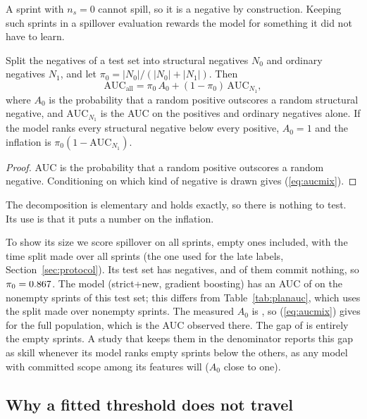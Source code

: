 A sprint with $n_s = 0$ cannot spill, so it is a negative by construction. Keeping such sprints in a spillover evaluation rewards the model for something it did not have to learn.

\begin{proposition}
\label{prop:auc}
Split the negatives of a test set into structural negatives $N_0$ and ordinary negatives $N_1$, and let $\pi_0 = |N_0| / (|N_0| + |N_1|)$. Then
\begin{equation}
\mathrm{AUC}_{\mathrm{all}} = \pi_0\, A_0 + (1 - \pi_0)\, \mathrm{AUC}_{N_1},
\label{eq:aucmix}
\end{equation}
where $A_0$ is the probability that a random positive outscores a random structural negative, and $\mathrm{AUC}_{N_1}$ is the AUC on the positives and ordinary negatives alone. If the model ranks every structural negative below every positive, $A_0 = 1$ and the inflation is $\pi_0 (1 - \mathrm{AUC}_{N_1})$.
\end{proposition}

\begin{proof}
AUC is the probability that a random positive outscores a random negative. Conditioning on which kind of negative is drawn gives (\ref{eq:aucmix}).
\end{proof}

The decomposition is elementary and holds exactly, so there is nothing to test. Its use is that it puts a number on the inflation.

To show its size we score spillover on all sprints, empty ones included, with the time split made over all sprints (the one used for the late labels, Section~\ref{sec:protocol}). Its test set has \NegAll{} negatives, and \NegStruct{} of them commit nothing, so $\pi_0 = 0.867$. The model (strict+new, gradient boosting) has an AUC of \AucNonempty{} on the \TestFullNonempty{} nonempty sprints of this test set; this differs from Table~\ref{tab:planauc}, which uses the split made over nonempty sprints. The measured $A_0$ is \AZero, so (\ref{eq:aucmix}) gives \AucPred{} for the full population, which is the AUC observed there. The gap of \Inflation{} is entirely the empty sprints. A study that keeps them in the denominator reports this gap as skill whenever its model ranks empty sprints below the others, as any model with committed scope among its features will ($A_0$ close to one).

\subsection{Why a fitted threshold does not travel}

